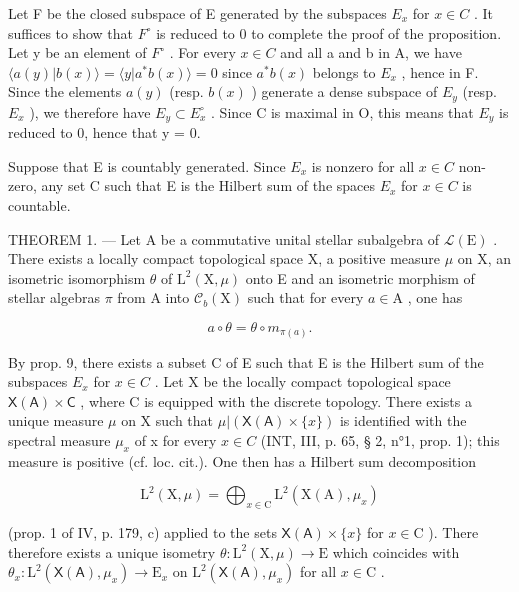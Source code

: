 Let F be the closed subspace of E generated by the subspaces \(E_{x}\) for \(x \in C\) . It suffices to show that \(F^{\circ}\) is reduced to 0 to complete the proof of the proposition. Let y be an element of \(F^{\circ}\) . For every \(x \in C\) and all a and b in A, we have \(\langle a(y) | b(x) \rangle = \langle y | a^{*}b(x) \rangle = 0\) since \(a^{*}b(x)\) belongs to \(E_{x}\) , hence in F. Since the elements \(a(y)\) (resp. \(b(x)\) ) generate a dense subspace of \(E_{y}\) (resp. \(E_{x}\) ), we therefore have \(E_{y} \subset E_{x}^{\circ}\) . Since C is maximal in O, this means that \(E_{y}\) is reduced to 0, hence that y = 0.

Suppose that E is countably generated. Since \(E_{x}\) is nonzero for all \(x \in C\) non-zero, any set C such that E is the Hilbert sum of the spaces \(E_{x}\) for \(x \in C\) is countable.

THEOREM 1. --- Let A be a commutative unital stellar subalgebra of \(\mathcal{L}(\mathrm{E})\) . There exists a locally compact topological space X, a positive measure \(\mu\) on X, an isometric isomorphism \(\theta\) of \(\mathrm{L}^2 (\mathrm{X},\mu)\) onto E and an isometric morphism of stellar algebras \(\pi\) from A into \(\mathcal{C}_b(\mathrm{X})\) such that for every \(a\in \mathrm{A}\) , one has

\[
a \circ \theta = \theta \circ m _ {\pi (a)}.
\]

By prop. 9, there exists a subset C of E such that E is the Hilbert sum of the subspaces \(E_{x}\) for \(x \in C\) . Let X be the locally compact topological space \(\mathsf{X}(\mathsf{A}) \times \mathsf{C}\) , where C is equipped with the discrete topology. There exists a unique measure \(\mu\) on X such that \(\mu|(\mathsf{X}(\mathsf{A}) \times \{x\})\) is identified with the spectral measure \(\mu_{x}\) of x for every \(x \in C\) (INT, III, p. 65, § 2, n°1, prop. 1); this measure is positive (cf. loc. cit.). One then has a Hilbert sum decomposition

\[
\mathrm{L} ^ {2} (\mathrm{X}, \mu) = \bigoplus_ {x \in \mathrm{C}} \mathrm{L} ^ {2} (\mathrm{X} (\mathrm{A}), \mu_ {x})
\]

(prop. 1 of IV, p. 179, c) applied to the sets \(\mathsf{X}(\mathsf{A}) \times \{x\}\) for \(x \in \mathrm{C}\) ). There therefore exists a unique isometry \(\theta: \mathrm{L}^2(\mathrm{X}, \mu) \to \mathrm{E}\) which coincides with \(\theta_x: \mathrm{L}^2(\mathsf{X}(\mathsf{A}), \mu_x) \to \mathrm{E}_x\) on \(\mathrm{L}^2(\mathsf{X}(\mathsf{A}), \mu_x)\) for all \(x \in \mathrm{C}\) .

